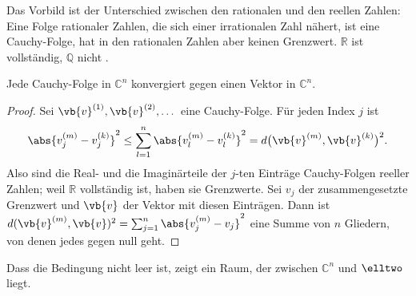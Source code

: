 \begin{fundament}[id=c03.f3,
    titel={Vollständigkeit},
    wozu={Der Kern sagt, dass einem Vektorraum mit Skalarprodukt zum Hilbertraum noch eine
      Bedingung fehlt und dass sie in $\mathbb{C}^n$ immer gilt. Hier steht, was die
      Bedingung verlangt, warum $\mathbb{C}^n$, $\elltwo$ und $\Ltwo{\mathbb{R}}$ sie
      erfüllen, und ein Raum, der sie verletzt.},
    voraussetzung={Vertiefungen~\ref{c03.v1} und~\ref{c03.v2}, Fundament~\ref{c03.f2};
      Folgen und Grenzwerte.},
    zurueck={$\mathbb{C}^n$, $\elltwo$ und $\Ltwo{\mathbb{R}}$ sind vollständig. Wer mit
      ihnen rechnet, braucht über die Bedingung nicht nachzudenken.}]

  Das Vorbild ist der Unterschied zwischen den rationalen und den reellen Zahlen: Eine Folge
  rationaler Zahlen, die sich einer irrationalen Zahl nähert, ist eine Cauchy-Folge, hat in
  den rationalen Zahlen aber keinen Grenzwert. $\mathbb{R}$ ist vollständig, $\mathbb{Q}$
  nicht .

  \begin{proposition}\label{c03.prop.cn-vollstaendig}
    Jede Cauchy-Folge in $\mathbb{C}^n$ konvergiert gegen einen Vektor in $\mathbb{C}^n$.
  \end{proposition}
  \begin{proof}
    Sei $\vb{v}^{(1)}, \vb{v}^{(2)}, \dots$ eine Cauchy-Folge. Für jeden Index $j$ ist
    \begin{equation}\label{c03.eq.komponente}
      \abs{v_j^{(m)} - v_j^{(k)}}^2
      \leq \sum_{l=1}^{n} \abs{v_l^{(m)} - v_l^{(k)}}^2
      = d\bigl(\vb{v}^{(m)}, \vb{v}^{(k)}\bigr)^2 .
    \end{equation}
    Also sind die Real- und die Imaginärteile der $j$-ten Einträge Cauchy-Folgen reeller
    Zahlen; weil $\mathbb{R}$ vollständig ist, haben sie Grenzwerte. Sei $v_j$ der
    zusammengesetzte Grenzwert und $\vb{v}$ der Vektor mit diesen Einträgen. Dann ist
    $d(\vb{v}^{(m)}, \vb{v})^2 = \sum_{j=1}^{n} \abs{v_j^{(m)} - v_j}^2$ eine Summe von
    $n$ Gliedern, von denen jedes gegen null geht.
  \end{proof}

  Dass die Bedingung nicht leer ist, zeigt ein Raum, der zwischen $\mathbb{C}^n$ und
  $\elltwo$ liegt.


\end{fundament}
